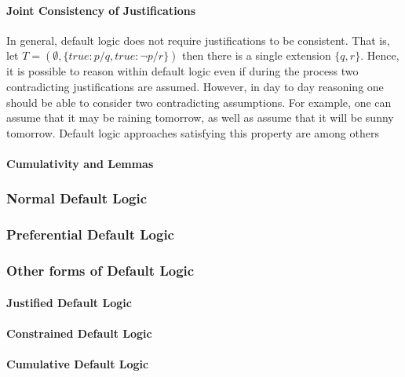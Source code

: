 \documentclass{article}
\begin{document}
\paragraph*{Joint Consistency of Justifications}
In general, default logic does not require justifications to be consistent. That is, 
let $T=(\emptyset, \{true:p/q, true:\neg p / r\})$ then there is a single extension $\{q,r\}$.  Hence, it is possible to reason within default logic even if during the process two contradicting justifications are assumed. However, in day to day reasoning one should be able to consider two contradicting assumptions. For example, one can assume that it may be raining tomorrow, as well as assume that it will be sunny tomorrow. Default logic approaches satisfying this property are among others 

\paragraph*{Cumulativity and Lemmas}


\subsubsection*{Normal Default Logic}

\subsubsection*{Preferential Default Logic}

\subsubsection*{Other forms of Default Logic}
\paragraph*{Justified Default Logic}
\paragraph*{Constrained Default Logic}
\paragraph*{Cumulative Default Logic}
\end{document}
